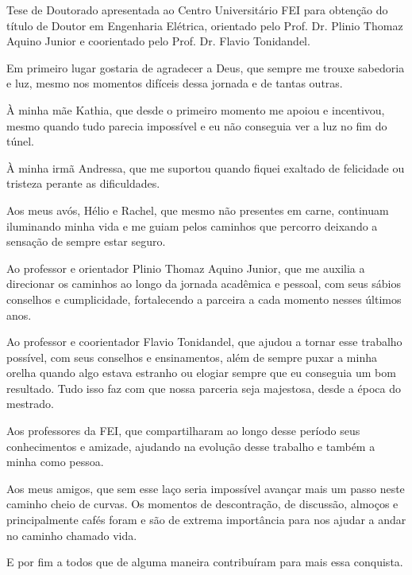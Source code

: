 \maketitle{}

\begin{folhaderosto}
Tese de Doutorado apresentada ao Centro Universitário FEI para obtenção do título de Doutor em Engenharia Elétrica, orientado pelo Prof. Dr. Plinio Thomaz Aquino Junior e coorientado pelo Prof. Dr. Flavio Tonidandel.
\end{folhaderosto}

\fichacatalografica
\folhadeaprovacao



\begin{agradecimentos}
Em primeiro lugar gostaria de agradecer a Deus, que sempre me trouxe sabedoria e luz, mesmo nos momentos difíceis dessa jornada e de tantas outras.

À minha mãe Kathia, que desde o primeiro momento me apoiou e incentivou, mesmo quando tudo parecia impossível e eu não conseguia ver a luz no fim do túnel.

À minha irmã Andressa, que me suportou quando fiquei exaltado de felicidade ou tristeza perante as dificuldades.

Aos meus avós, Hélio e Rachel, que mesmo não presentes em carne, continuam iluminando minha vida e me guiam pelos caminhos que percorro deixando a sensação de sempre estar seguro.

Ao professor e orientador Plinio Thomaz Aquino Junior, que me auxilia a direcionar os caminhos ao longo da jornada acadêmica e pessoal, com seus sábios conselhos e cumplicidade, fortalecendo a parceira a cada momento nesses últimos anos.

Ao professor e coorientador Flavio Tonidandel, que ajudou a tornar esse trabalho possível, com seus conselhos e ensinamentos, além de sempre puxar a minha orelha quando algo estava estranho ou elogiar sempre que eu conseguia um bom resultado. Tudo isso faz com que nossa parceria seja majestosa, desde a época do mestrado.

Aos professores da FEI, que compartilharam ao longo desse período seus conhecimentos e amizade, ajudando na evolução desse trabalho e também a minha como pessoa.

Aos meus amigos, que sem esse laço seria impossível avançar mais um passo neste caminho cheio de curvas. Os momentos de descontração, de discussão, almoços e principalmente cafés foram e são de extrema importância para nos ajudar a andar no caminho chamado vida.

E por fim a todos que de alguma maneira contribuíram para mais essa conquista.

\end{agradecimentos}

